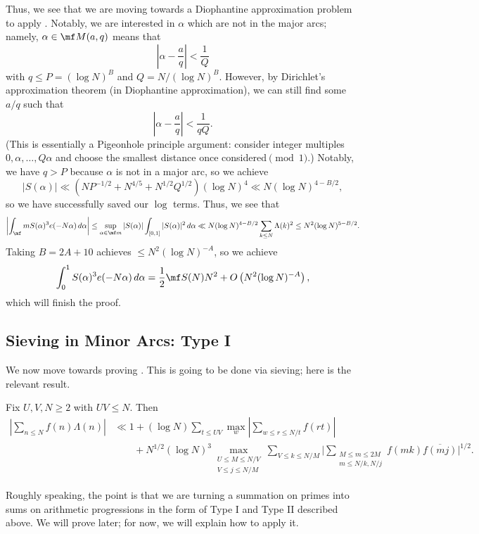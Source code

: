 \documentclass[../notes.tex]{subfiles}
\begin{document}
Thus, we see that we are moving towards a Diophantine approximation problem to apply . Notably, we are interested in $\alpha$ which are not in the major arcs; namely, $\alpha\in\mf M(a,q)$ means that
\[\left|\alpha-\frac aq\right|<\frac1Q\]
with $q\le P=(\log N)^B$ and $Q=N/(\log N)^B$. However, by Dirichlet's approximation theorem (in Diophantine approximation), we can still find some $a/q$ such that
\[\left|\alpha-\frac aq\right|<\frac1{qQ}.\]
(This is essentially a Pigeonhole principle argument: consider integer multiples $0,\alpha,\ldots,Q\alpha$ and choose the smallest distance once considered$\pmod1$.) Notably, we have $q>P$ because $\alpha$ is not in a major arc, so we achieve
\[|S(\alpha)|\ll\left(NP^{-1/2}+N^{4/5}+N^{1/2}Q^{1/2}\right)(\log N)^4\ll N(\log N)^{4-B/2},\]
so we have successfully saved our $\log$ terms. Thus, we see that
\[\left|\int_\mf mS(\alpha)^3e(-N\alpha)\,d\alpha\right|\le\sup_{\alpha\in\mf m}|S(\alpha)|\int_{[0,1]}|S(\alpha)|^2\,d\alpha\ll N(\log N)^{4-B/2}\sum_{k\le N}\Lambda(k)^2\le N^2(\log N)^{5-B/2}.\]
Taking $B=2A+10$ achieves $\le N^2(\log N)^{-A}$, so we achieve
\[\int_0^1S(\alpha)^3e(-N\alpha)\,d\alpha=\frac12\mf S(N)N^2+O\left(N^2(\log N)^{-A}\right),\]
which will finish the proof.

\subsection{Sieving in Minor Arcs: Type I}
We now move towards proving . This is going to be done via sieving; here is the relevant result.
\begin{theorem} \label{thm:vinogradov-sieve}
	Fix $U,V,N\ge2$ with $UV\le N$. Then
	\begin{align*}
		\left|\sum_{n\le N}f(n)\Lambda(n)\right| &\ll 1+(\log N)\sum_{t\le UV}\max_w\left|\sum_{w\le r\le N/t}f(rt)\right| \\
		&\qquad+N^{1/2}(\log N)^3\max_{\substack{U\le M\le N/V\\V\le j\le N/M}}\sum_{V\le k\le N/M}\Bigg|\sum_{\substack{M\le m\le2M\\m\le N/k,N/j}}f(mk)\overline{f(mj)}\Bigg|^{1/2}.
	\end{align*}
\end{theorem}
Roughly speaking, the point is that we are turning a summation on primes into sums on arithmetic progressions in the form of Type I and Type II described above. We will prove  later; for now, we will explain how to apply it.
\end{document}
